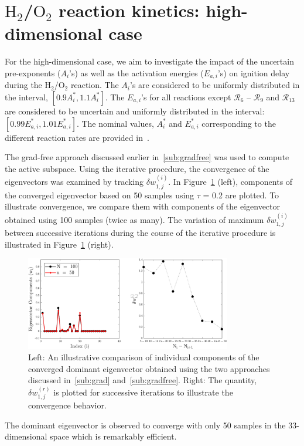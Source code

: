 \section{$\text{H}_2$/$\text{O}_2$ reaction kinetics: high-dimensional case}
\label{sec:app}

For the high-dimensional case, we aim to investigate the impact of the uncertain
pre-exponents ($A_i$'s) as well as the activation energies ($E_{a,i}$'s) on ignition 
delay during the H$_2$/O$_2$ reaction. The $A_i$'s are considered to be uniformly
distributed in the interval, $[0.9A_i^\ast, 1.1A_i^\ast]$. The $E_{a,i}$'s for all
reactions except $\mathcal{R}_6$ -- $\mathcal{R}_9$ and $\mathcal{R}_{13}$
are considered to be uncertain and uniformly distributed in the interval: 
$[0.99E_{a,i}^\ast, 1.01E_{a,i}^\ast]$. The nominal values, $A_i^\ast$ and $E_{a,i}^\ast$
corresponding to the different reaction rates are provided in~\cite{Yetter:1991}. 

The grad-free approach discussed earlier in~\ref{sub:gradfree} was used to compute the
active subspace. Using the iterative procedure, the convergence of the eigenvectors
was examined by tracking $\delta w_{1,j}^{(i)}$. In Figure~\ref{fig:conv_app} (left),
components of the converged eigenvector based on 50 samples using $\tau$ = 0.2 are plotted.
To illustrate convergence, we compare them with components of the eigenvector obtained
using 100 samples (twice as many). The variation of maximum $\delta w_{1,j}^{(i)}$ between
successive iterations during the course of the iterative procedure is illustrated in 
Figure~\ref{fig:conv_app} (right). 
%
\begin{figure}[htbp]
 \begin{center}
  \includegraphics[width=0.8\textwidth]{./Figures/eigv10}
\caption{Left: An illustrative comparison of individual components of the converged dominant eigenvector obtained
using the two approaches discussed in~\ref{sub:grad} and~\ref{sub:gradfree}. Right: The quantity,  $\delta w_{1,j}^{(r)}$
is plotted for successive iterations to illustrate the convergence behavior.}
\label{fig:conv_app}
\end{center}
\end{figure}
%
The dominant eigenvector is observed to converge with only 50 samples in the 33-dimensional space which is remarkably efficient. 

